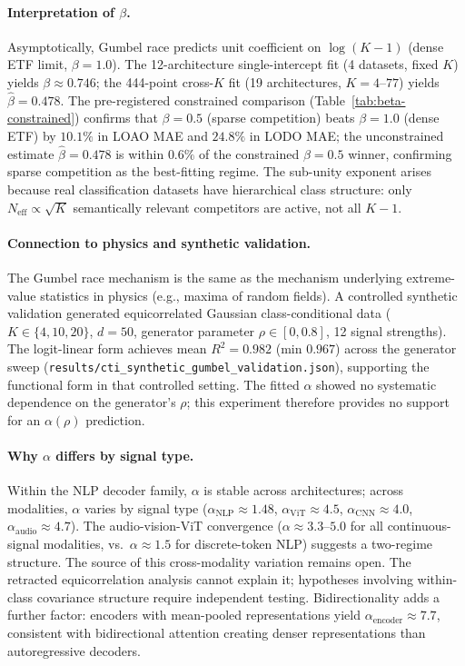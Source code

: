\documentclass{article}
\begin{document}
\paragraph{Interpretation of $\beta$.}
Asymptotically, Gumbel race predicts unit coefficient on $\log(K-1)$ (dense ETF limit, $\beta=1.0$).
The 12-architecture single-intercept fit (4 datasets, fixed $K$) yields $\beta\approx0.746$;
the 444-point cross-$K$ fit (19 architectures, $K=4$--$77$) yields $\hat\beta=0.478$.
The pre-registered constrained comparison (Table~\ref{tab:beta-constrained}) confirms that
$\beta=0.5$ (sparse competition) beats $\beta=1.0$ (dense ETF) by $10.1\%$ in LOAO MAE and $24.8\%$
in LODO MAE; the unconstrained estimate $\hat\beta=0.478$ is within $0.6\%$ of the constrained
$\beta=0.5$ winner, confirming sparse competition as the best-fitting regime.
The sub-unity exponent arises because real classification datasets have hierarchical class
structure: only $N_\mathrm{eff}\propto\sqrt{K}$ semantically relevant competitors are active,
not all $K-1$.

\paragraph{Connection to physics and synthetic validation.}
The Gumbel race mechanism is the same as the mechanism underlying extreme-value statistics in physics (e.g., maxima of random fields).
A controlled synthetic validation generated equicorrelated Gaussian class-conditional data ($K\in\{4,10,20\}$, $d=50$, generator parameter $\rho\in[0,0.8]$, 12 signal strengths). The logit-linear form achieves mean $R^2=0.982$ (min $0.967$) across the generator sweep (\texttt{results/cti\_synthetic\_gumbel\_validation.json}), supporting the functional form in that controlled setting. The fitted $\alpha$ showed no systematic dependence on the generator's $\rho$; this experiment therefore provides no support for an $\alpha(\rho)$ prediction.

\paragraph{Why $\alpha$ differs by signal type.}
Within the NLP decoder family, $\alpha$ is stable across architectures; across modalities, $\alpha$ varies by signal type ($\alpha_\mathrm{NLP}\approx1.48$, $\alpha_\mathrm{ViT}\approx4.5$, $\alpha_\mathrm{CNN}\approx4.0$, $\alpha_\mathrm{audio}\approx4.7$). The audio-vision-ViT convergence ($\alpha\approx3.3$--$5.0$ for all continuous-signal modalities, vs.\ $\alpha\approx1.5$ for discrete-token NLP) suggests a two-regime structure.
The source of this cross-modality variation remains open. The retracted equicorrelation analysis cannot explain it; hypotheses involving within-class covariance structure require independent testing.
Bidirectionality adds a further factor: encoders with mean-pooled representations yield $\alpha_\mathrm{encoder}\approx7.7$, consistent with bidirectional attention creating denser representations than autoregressive decoders.
\end{document}
